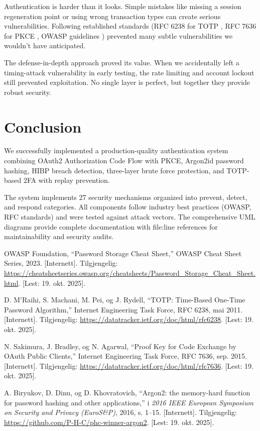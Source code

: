 \documentclass[12pt,a4paper]{article}
\begin{document}
Authentication is harder than it looks. Simple mistakes like missing a session regeneration point or using wrong transaction types can create serious vulnerabilities. Following established standards (RFC 6238 for TOTP \cite{mraihi2011}, RFC 7636 for PKCE \cite{sakimura2015}, OWASP guidelines \cite{owasp_password}) prevented many subtle vulnerabilities we wouldn't have anticipated.

The defense-in-depth approach proved its value. When we accidentally left a timing-attack vulnerability in early testing, the rate limiting and account lockout still prevented exploitation. No single layer is perfect, but together they provide robust security.

\section{Conclusion}

We successfully implemented a production-quality authentication system combining OAuth2 Authorization Code Flow with PKCE, Argon2id password hashing, HIBP breach detection, three-layer brute force protection, and TOTP-based 2FA with replay prevention.

The system implements 27 security mechanisms organized into prevent, detect, and respond categories. All components follow industry best practices (OWASP, RFC standards) and were tested against attack vectors. The comprehensive UML diagrams provide complete documentation with file:line references for maintainability and security audits.

\begin{thebibliography}{9}

OWASP Foundation, ``Password Storage Cheat Sheet,'' OWASP Cheat Sheet Series, 2023. [Internett]. Tilgjengelig: \url{https://cheatsheetseries.owasp.org/cheatsheets/Password_Storage_Cheat_Sheet.html}. [Lest: 19. okt. 2025].

D. M'Raihi, S. Machani, M. Pei, og J. Rydell, ``TOTP: Time-Based One-Time Password Algorithm,'' Internet Engineering Task Force, RFC 6238, mai 2011. [Internett]. Tilgjengelig: \url{https://datatracker.ietf.org/doc/html/rfc6238}. [Lest: 19. okt. 2025].

N. Sakimura, J. Bradley, og N. Agarwal, ``Proof Key for Code Exchange by OAuth Public Clients,'' Internet Engineering Task Force, RFC 7636, sep. 2015. [Internett]. Tilgjengelig: \url{https://datatracker.ietf.org/doc/html/rfc7636}. [Lest: 19. okt. 2025].

A. Biryukov, D. Dinu, og D. Khovratovich, ``Argon2: the memory-hard function for password hashing and other applications,'' i \textit{2016 IEEE European Symposium on Security and Privacy (EuroS\&P)}, 2016, s. 1--15. [Internett]. Tilgjengelig: \url{https://github.com/P-H-C/phc-winner-argon2}. [Lest: 19. okt. 2025].

\end{thebibliography}

\listoffigures
\end{document}
